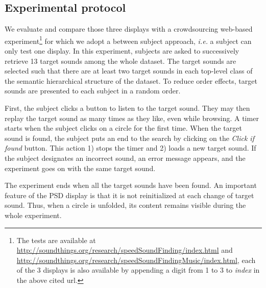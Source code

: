 \documentclass{aes2e}
\begin{document}
\subsection{Experimental protocol}

We evaluate and compare those three displays with a crowdsourcing web-based experiment\footnote{The tests are available at \url{http://soundthings.org/research/speedSoundFinding/index.html} and \url{http://soundthings.org/research/speedSoundFindingMusic/index.html}, each of the 3 displays is also available by appending a digit from 1 to 3 to \textit{index} in the above cited url.} for which we adopt a between subject approach, \textit{i.e.} a subject can only test one display. In this experiment, subjects are asked to successively retrieve 13 target sounds among the whole dataset. The target sounds are selected such that there are at least two target sounds in each top-level class of the semantic hierarchical structure of the dataset. To reduce order effects, target sounds are presented to each subject in a random order.

First, the subject clicks a button to listen to the target sound. They may then replay the target sound as many times as they like, even while browsing. A timer starts when the subject clicks on a circle for the first time. When the target sound is found, the subject puts an end to the search by clicking on the \textit{Click if found} button. This action 1) stops the timer and 2) loads a new target sound. If the subject designates an incorrect sound, an error message appears, and the experiment goes on with the same target sound.



The experiment ends when all the target sounds have been found. An important feature of the PSD display is that it is not reinitialized at each change of target sound. Thus, when a circle is unfolded, its content remains visible during the whole experiment.
\end{document}
